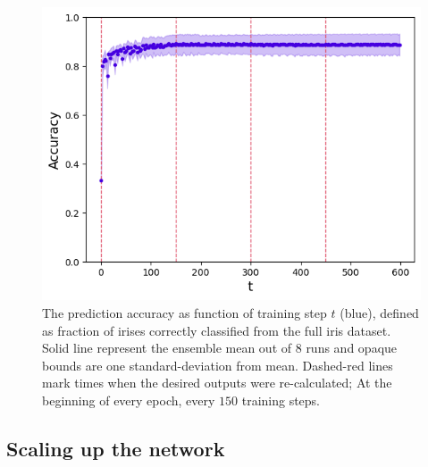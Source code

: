 \documentclass[%
 reprint,
 amsmath,amssymb,
 aps,
]{revtex4-2}
\begin{document}
    \begin{figure}[ht]
    \centerline{
    \includegraphics[width=\columnwidth]{Figures/accuracy_vs_t_markers.png}
    }
    \caption{The prediction accuracy as function of training step $t$ (blue), defined as fraction of irises correctly classified from the full iris dataset. Solid line represent the ensemble mean out of $8$ runs and opaque bounds are one standard-deviation from mean. Dashed-red lines mark times when the desired outputs were re-calculated; At the beginning of every epoch, every $150$ training steps.}
    \label{fig:accuracy_vs_t}
    \end{figure}    

\subsection{Scaling up the network}\label{sec:scaling_up}
\end{document}
